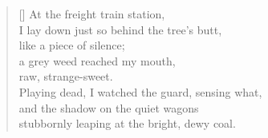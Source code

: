 \documentclass[a4paper,12pt,twoside,final]{book}
\begin{document}
\newpage


\settowidth{\versewidth}{stubbornly leaping at the bright, dewy coal.}

\begin{verse}[\versewidth]
  At the freight train station, \\
  I lay down just so behind the tree's butt, \\
  like a piece of silence; \\
  a grey weed reached my mouth, \\
  raw, strange-sweet. \\
  Playing dead, I watched the guard, sensing what, \\
  and the shadow on the quiet wagons \\
  stubbornly leaping at the bright, dewy coal.
\end{verse}


\newpage

\settowidth{\versewidth}{Csak ami nincs, annak van bokra,}
\end{document}
